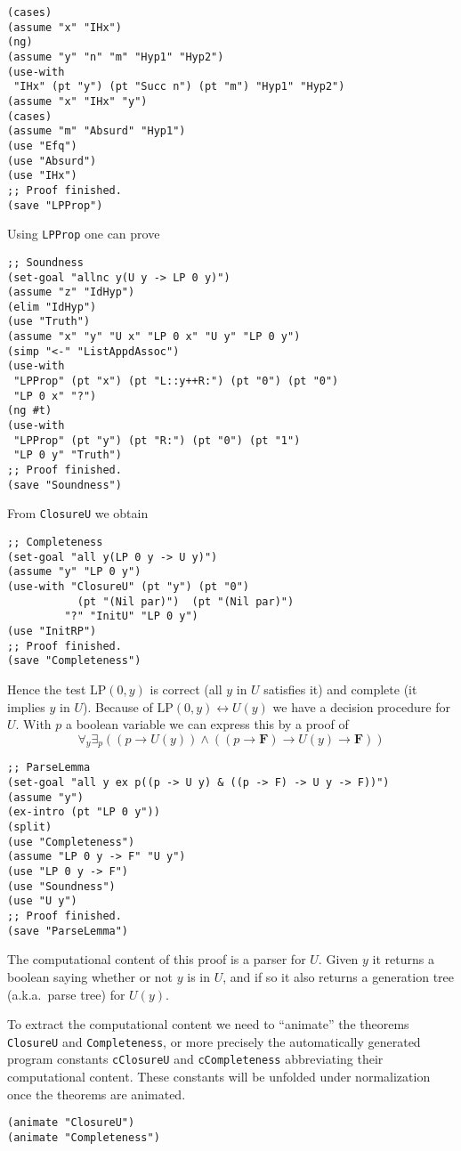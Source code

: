 \documentclass[12pt]{amsart}
\newcommand{\ex}{\exists} %
\newcommand{\falsityF}{\mathbf{F}}
\newcommand{\inquotes}[1]{``#1''}
\begin{document}
\begin{appendix}
\begin{verbatim}
(cases)
(assume "x" "IHx")
(ng)
(assume "y" "n" "m" "Hyp1" "Hyp2")
(use-with
 "IHx" (pt "y") (pt "Succ n") (pt "m") "Hyp1" "Hyp2")
(assume "x" "IHx" "y")
(cases)
(assume "m" "Absurd" "Hyp1")
(use "Efq")
(use "Absurd")
(use "IHx")
;; Proof finished.
(save "LPProp")
\end{verbatim}
Using \verb|LPProp| one can prove
\begin{verbatim}
;; Soundness
(set-goal "allnc y(U y -> LP 0 y)")
(assume "z" "IdHyp")
(elim "IdHyp")
(use "Truth")
(assume "x" "y" "U x" "LP 0 x" "U y" "LP 0 y")
(simp "<-" "ListAppdAssoc")
(use-with
 "LPProp" (pt "x") (pt "L::y++R:") (pt "0") (pt "0")
 "LP 0 x" "?")
(ng #t)
(use-with
 "LPProp" (pt "y") (pt "R:") (pt "0") (pt "1")
 "LP 0 y" "Truth")
;; Proof finished.
(save "Soundness")
\end{verbatim}
From \verb|ClosureU| we obtain 
\begin{verbatim}
;; Completeness
(set-goal "all y(LP 0 y -> U y)")
(assume "y" "LP 0 y")
(use-with "ClosureU" (pt "y") (pt "0")
           (pt "(Nil par)")  (pt "(Nil par)")
         "?" "InitU" "LP 0 y")
(use "InitRP")
;; Proof finished.
(save "Completeness")
\end{verbatim}
Hence the test $\mathrm{LP}(0,y)$ is correct (all $y$ in $U$ satisfies
it) and complete (it implies $y$ in $U$).  Because of
$\mathrm{LP}(0,y) \leftrightarrow U(y)$ we have a decision procedure
for $U$.  With $p$ a boolean variable we can express this by a proof
of
\begin{equation*}
 \forall_y \ex_p((p \to U(y)) \land
                 ((p \to \falsityF) \to U(y) \to \falsityF))
\end{equation*}
\begin{verbatim}
;; ParseLemma
(set-goal "all y ex p((p -> U y) & ((p -> F) -> U y -> F))")
(assume "y")
(ex-intro (pt "LP 0 y"))
(split)
(use "Completeness")
(assume "LP 0 y -> F" "U y")
(use "LP 0 y -> F")
(use "Soundness")
(use "U y")
;; Proof finished.
(save "ParseLemma")
\end{verbatim}
The computational content of this proof is a parser for $U$.  Given
$y$ it returns a boolean saying whether or not $y$ is in $U$, and if
so it also returns a generation tree (a.k.a.\ parse tree) for $U(y)$.

To extract the computational content we need to \inquotes{animate} the
theorems \verb|ClosureU| and \verb|Completeness|, or more precisely
the automatically generated program constants \verb|cClosureU| and
\verb|cCompleteness| abbreviating their computational content.
These constants will be unfolded under normalization once the theorems
are animated.
\begin{verbatim}
(animate "ClosureU")
(animate "Completeness")


\end{verbatim}
\end{appendix}
\end{document}
